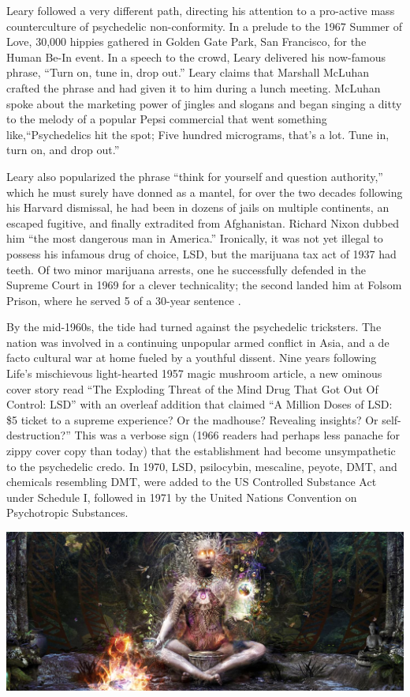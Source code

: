 \documentclass{UIdahoMastersThesis}
\begin{document}
Leary followed a very different path, directing his attention to a pro-active mass counterculture of psychedelic non-conformity. In a prelude to the 1967 Summer of Love, 30,000 hippies gathered in Golden Gate Park, San Francisco, for the Human Be-In event. In a speech to the crowd, Leary delivered his now-famous phrase, ``Turn on, tune in, drop out.'' Leary claims that Marshall McLuhan crafted the phrase and had given it to him during a lunch meeting. McLuhan spoke about the marketing power of jingles and slogans and began singing a ditty to the melody of a popular Pepsi commercial that went something like,\enquote{Psychedelics hit the spot; Five hundred micrograms, that's a lot. Tune in, turn on, and drop out.}

Leary also popularized the phrase ``think for yourself and question authority,'' which he must surely have donned as a mantel, for over the two decades following his Harvard dismissal, he had been in dozens of jails on multiple continents, an escaped fugitive, and finally extradited from Afghanistan. Richard Nixon dubbed him ``the most dangerous man in America.'' Ironically, it was not yet illegal to possess his infamous drug of choice, LSD, but the marijuana tax act of 1937 had teeth. Of two minor marijuana arrests, one he successfully defended in the Supreme Court in 1969 for a clever technicality; the second landed him at Folsom Prison, where he served 5 of a 30-year sentence \cite{higgs_i_2006}.

By the mid-1960s, the tide had turned against the psychedelic tricksters. The nation was involved in a continuing unpopular armed conflict in Asia, and a de facto cultural war at home fueled by a youthful dissent. Nine years following Life's mischievous light-hearted 1957 magic mushroom article, a new ominous cover story read \enquote{The Exploding Threat of the Mind Drug That Got Out Of Control: LSD} with an overleaf addition that claimed \enquote{A Million Doses of LSD: \$5 ticket to a supreme experience? Or the madhouse? Revealing insights? Or self-destruction?} This was a verbose sign (1966 readers had perhaps less panache for zippy cover copy than today) that the establishment had become unsympathetic to the psychedelic credo. In 1970, LSD, psilocybin, mescaline, peyote, DMT, and chemicals resembling DMT, were added to the US Controlled Substance Act under Schedule I, followed in 1971 by the United Nations Convention on Psychotropic Substances. 

\newpage
\noindent
\includegraphics[width=\linewidth]{shaman_head.png}
\end{document}
